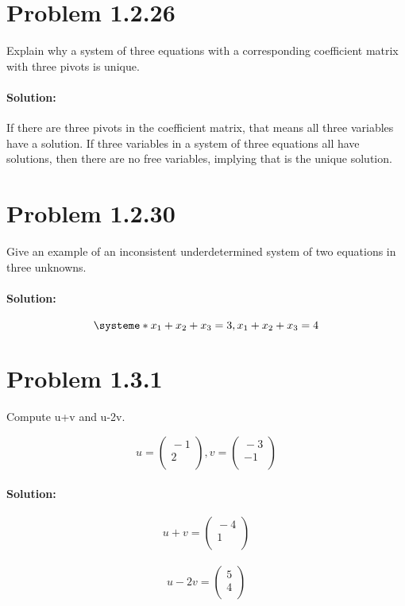 \documentclass[11pt, notitlepage]{report}
\newenvironment{solution}{\paragraph{Solution:}}{\hfill}
\begin{document}
\newpage
\section{Problem 1.2.26}

Explain why a system of three equations with a corresponding coefficient matrix with three pivots is unique.

\begin{solution}
If there are three pivots in the coefficient matrix, that means all three variables have a solution. If three variables in a system of three equations all have solutions, then there are no free variables, implying that is the unique solution.
\end{solution}

\section{Problem 1.2.30}

Give an example of an inconsistent underdetermined system of two equations in three unknowns.

\begin{solution}

\[
\systeme*{x_1+x_2+x_3=3, x_1+x_2+x_3=4}
\]

\end{solution}


\section{Problem 1.3.1}

Compute u+v and u-2v.

\[u=\left(\begin{matrix}{}
  -1 \\
  2 \\
\end{matrix}\right),
%
v=\left(\begin{matrix}{}
  -3 \\
  -1 \\
\end{matrix}\right)
\]


\begin{solution}

\[
	u+v=\left(\begin{matrix}{}
  -4 \\
  1 \\
\end{matrix}\right)\]\\
\[u-2v=\left(\begin{matrix}{}
  5 \\
  4 \\
\end{matrix}\right)
\]
\end{solution}
\end{document}
